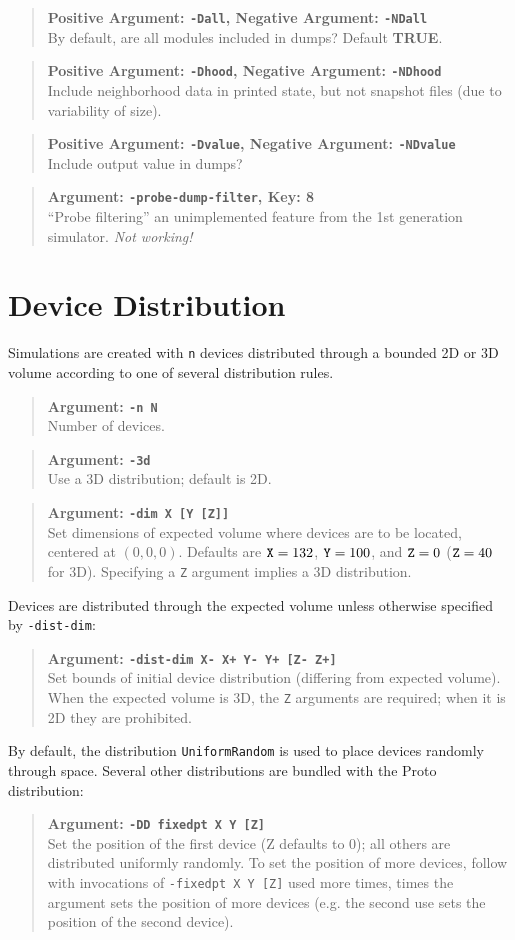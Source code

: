 \documentclass{article}
\newcommand\broken{{\em Not working!}}
\newcommand\true{{\bf TRUE}}
\newcommand\var[1]{{\tt #1}}
\newcommand\key[1]{{\bf #1}}
\newcommand\simarg[2]{\begin{quote} {\bf Argument: \var{#1}} \\ #2 \end{quote}}
\newcommand\simargkey[3]{
  \begin{quote} {\bf Argument: \var{#1}, Key: \key{#2}} \\ #3 \end{quote}
}
\newcommand\simPMarg[3]{
  \begin{quote}
    {\bf Positive Argument: \var{#1}, Negative Argument: \var{#2}} \\ #3
  \end{quote}
}
\begin{document}
\simPMarg{-Dall}{-NDall}{By default, are all modules included in dumps?
  Default \true{}.}
\simPMarg{-Dhood}{-NDhood}{Include neighborhood data in printed state, 
  but not snapshot files (due to variability of size).}
\simPMarg{-Dvalue}{-NDvalue}{Include output value in dumps?}

\simargkey{-probe-dump-filter}{8}{``Probe filtering'' an unimplemented feature
  from the 1st generation simulator. \broken{}}


\section{Device Distribution}
\label{s:distribution}

Simulations are created with \var{n} devices distributed through a
bounded 2D or 3D volume according to one of several distribution
rules.

\simarg{-n N}{Number of devices.}  \simarg{-3d}{Use a 3D distribution;
  default is 2D.}  \simarg{-dim X [Y [Z]]}{Set dimensions of expected
  volume where devices are to be located, centered at $(0,0,0)$.
  Defaults are $\var{X}=132$, $\var{Y}=100$, and $\var{Z}=0$
  ($\var{Z}=40$ for 3D).  Specifying a \var{Z} argument implies a 3D
  distribution.}

Devices are distributed through the expected volume unless otherwise
specified by \var{-dist-dim}:

\simarg{-dist-dim X- X+ Y- Y+ [Z- Z+]}{Set bounds of initial device
  distribution (differing from expected volume).  When the expected
  volume is 3D, the \var{Z} arguments are required; when it is 2D they
  are prohibited.}

By default, the distribution \var{UniformRandom} is used to place
devices randomly through space.  Several other distributions are
bundled with the Proto distribution:

\simarg{-DD fixedpt X Y [Z]}{Set the position of the first device (Z
  defaults to 0); all others are distributed uniformly randomly.  To
  set the position of more devices, follow with invocations of
  \var{-fixedpt X Y [Z]} used more times, times the argument sets the
  position of more devices (e.g. the second use sets the position of
  the second device).}
\end{document}
